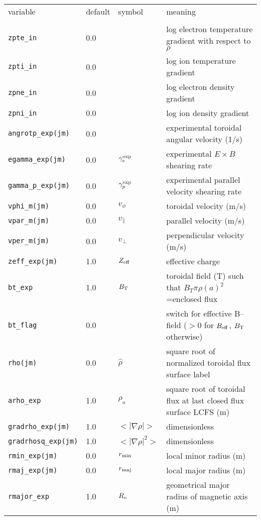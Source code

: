 \begin{center}
\begin{tabular}{lllp{4.5in}}
variable & default & symbol & meaning \\
\\
{\tt zpte\_in}     & 0.0 & & log electron temperature gradient with respect to $\rho$ \\
{\tt zpti\_in}     & 0.0 & & log ion temperature gradient \\
{\tt zpne\_in}     & 0.0 & & log electron density gradient \\
{\tt zpni\_in}     & 0.0 & & log ion density gradient \\
{\tt angrotp\_exp(jm)} & 0.0 & & experimental toroidal angular velocity (1/s) \\
{\tt egamma\_exp(jm)}  & 0.0 & $\gamma_e^{\rm exp}$ & experimental $E\times B$ shearing rate \\
{\tt gamma\_p\_exp(jm)}& 0.0 & $\gamma_p^{\rm exp}$ & experimental parallel velocity shearing rate \\
{\tt vphi\_m(jm)}      & 0.0 & $v_{\phi}$ & toroidal velocity (m/s) \\
{\tt vpar\_m(jm)}      & 0.0 & $v_{\parallel}$ & parallel velocity (m/s) \\
{\tt vper\_m(jm)}      & 0.0 & $v_{\perp}$ & perpendicular velocity (m/s) \\
{\tt zeff\_exp(jm)}    & 1.0 & $Z_{\rm eff}$ & effective charge \\
{\tt bt\_exp}          & 1.0 & $B_{\rm T}$ & toroidal field (T) such that $B_T\pi\rho(a)^2$=enclosed flux\\
{\tt bt\_flag}         & 0.0 & & switch for effective B--field ($> 0$ for $B_{\rm eff}$,  $B_{\rm T}$ otherwise) \\
{\tt rho(jm)}          & 0.0 & $\hat{\rho}$ & square root of normalized toroidal flux surface label \\
{\tt arho\_exp}        & 1.0 & $\rho_a$ & square root of toroidal flux at last closed flux surface LCFS (m) \\
{\tt gradrho\_exp(jm)} & 1.0 &  $< | \nabla \rho | >$ & dimensionless\\
{\tt gradrhosq\_exp(jm)} & 1.0 &  $< | \nabla \rho |^2 >$ & dimensionless\\
{\tt rmin\_exp(jm)}    & 0.0 & $r_{\rm min}$ & local minor radius (m) \\
{\tt rmaj\_exp(jm)}    & 0.0 & $r_{\rm maj}$ & local major radius (m) \\
{\tt rmajor\_exp}      & 1.0 & $R_{\rm o}$ & geometrical major radius of magnetic axis (m) \\

\end{tabular}
\end{center}
